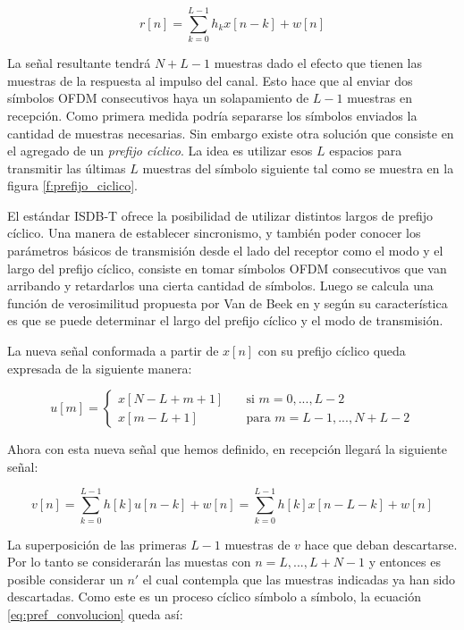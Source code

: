 \begin{equation}
r[n] = \sum_{k = 0}^{L-1} h_k x[n-k] + w[n]
\end{equation}

La señal resultante tendrá $N+L-1$ muestras dado el efecto que tienen las muestras de la respuesta al impulso del canal. Esto hace que al enviar dos símbolos OFDM consecutivos haya un solapamiento de $L-1$ muestras en recepción. Como primera medida podría separarse los símbolos enviados la cantidad de muestras necesarias. Sin embargo existe otra solución que consiste en el agregado de un \textit{prefijo cíclico}. La idea es utilizar esos $L$ espacios para transmitir las últimas $L$ muestras del símbolo siguiente tal como se muestra en la figura \ref{f:prefijo_ciclico}.



El estándar ISDB-T ofrece la posibilidad de utilizar distintos largos de prefijo cíclico. Una manera de establecer sincronismo, y también poder conocer los parámetros básicos de transmisión desde el lado del receptor como el modo y el largo del prefijo cíclico, consiste en tomar símbolos OFDM consecutivos que van arribando y retardarlos una cierta cantidad de símbolos. Luego se calcula una función de verosimilitud propuesta por Van de Beek en \cite{van1997ml} y según su característica es que se puede determinar el largo del prefijo cíclico y el modo de transmisión.  

La nueva señal conformada a partir de $x[n]$ con su prefijo cíclico queda expresada de la siguiente manera:

\begin{equation}
 u[m] =
  \begin{cases}
    x[N-L+m+1]       & \quad \text{si } m = 0,..., L-2\\
    x[m-L+1]  & \quad \text{para } m = L-1,..., N+L-2
  \end{cases}
\end{equation}

Ahora con esta nueva señal que hemos definido, en recepción llegará la siguiente señal:

\begin{equation}\label{eq:pref_convolucion}
v[n] = \sum_{k = 0}^{L-1}h[k]u[n-k] + w[n] = \sum_{k = 0}^{L-1}h[k]x[n-L-k] + w[n]
\end{equation}

La superposición de las primeras $L-1$ muestras de $v$ hace que deban descartarse. Por lo tanto se considerarán las muestas con $n = L,..., L+N-1$ y entonces es posible considerar un $n'$ el cual contempla que las muestras indicadas ya han sido descartadas. Como este es un proceso cíclico símbolo a símbolo, la ecuación \ref{eq:pref_convolucion} queda así: 

